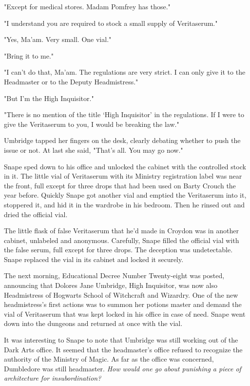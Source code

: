 \documentclass[a4paper,11pt]{article}
\begin{document}
"Except for medical stores. Madam Pomfrey has those."

"I understand you are required to stock a small supply of Veritaserum."

"Yes, Ma'am. Very small. One vial."

"Bring it to me."

"I can't do that, Ma'am. The regulations are very strict. I can only give it to the Headmaster or to the Deputy Headmistress."

"But I'm the High Inquisitor."

"There is no mention of the title `High Inquisitor' in the regulations. If I were to give the Veritaserum to you, I would be breaking the law."

Umbridge tapped her fingers on the desk, clearly debating whether to push the issue or not. At last she said, "That's all. You may go now."

Snape sped down to his office and unlocked the cabinet with the controlled stock in it. The little vial of Veritaserum with its Ministry registration label was near the front, full except for three drops that had been used on Barty Crouch the year before. Quickly Snape got another vial and emptied the Veritaserum into it, stoppered it, and hid it in the wardrobe in his bedroom. Then he rinsed out and dried the official vial.

The little flask of false Veritaserum that he'd made in Croydon was in another cabinet, unlabeled and anonymous. Carefully, Snape filled the official vial with the false serum, full except for three drops. The deception was undetectable. Snape replaced the vial in its cabinet and locked it securely.

The next morning, Educational Decree Number Twenty-eight was posted, announcing that Dolores Jane Umbridge, High Inquisitor, was now also Headmistress of Hogwarts School of Witchcraft and Wizardry. One of the new headmistress's first actions was to summon her potions master and demand the vial of Veritaserum that was kept locked in his office in case of need. Snape went down into the dungeons and returned at once with the vial.

It was interesting to Snape to note that Umbridge was still working out of the Dark Arts office. It seemed that the headmaster's office refused to recognize the authority of the Ministry of Magic. As far as the office was concerned, Dumbledore was still headmaster. \emph{How would one go about punishing a piece of architecture for insubordination?}
\end{document}
